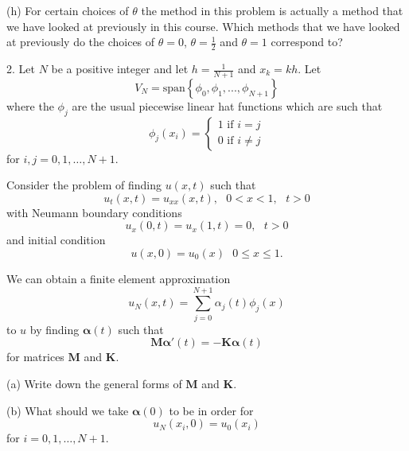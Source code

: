 \documentclass[11pt,twoside,reqno,a4paper]{amsart}
\begin{document}
(h) For certain choices of $\theta$ the method in this problem is actually a method that we have looked at previously in this course. Which methods that we have looked at previously do the choices of $\theta=0$, $\theta=\frac{1}{2}$ and $\theta=1$ correspond to?



\bigskip



2. Let $N$ be a positive integer and let $h=\frac{1}{N+1}$ and $x_k=kh$. Let
\[
V_N=\mbox{span}\left\{\phi_0,\phi_1,...,\phi_{N+1}\right\}
\]
where the $\phi_j$ are the usual piecewise linear hat functions which are such that
\[
\phi_j\left(x_i\right)=\left\{\begin{array}{c}1\mbox{ if }i=j \\ 0\mbox{ if } i\ne j\end{array}\right.
\]
for $i,j=0,1,\ldots,N+1$.

Consider the problem of finding $u\left(x,t\right)$ such that
\[
u_t\left(x,t\right)=u_{xx}\left(x,t\right),\mbox{ }0<x<1,\mbox{ }t>0
\]
with Neumann boundary conditions
\[
u_x\left(0,t\right)=u_x\left(1,t\right)=0,\mbox{ }t>0
\]
and initial condition
\[
u\left(x,0\right)=u_0\left(x\right)\mbox{ }0\le x\le1.
\]

We can obtain a finite element approximation
\[
u_N\left(x,t\right)=\sum_{j=0}^{N+1}\alpha_j\left(t\right)\phi_j\left(x\right)
\]
to $u$ by finding $\boldsymbol{\alpha}\left(t\right)$ such that
\[
\boldsymbol{M}\boldsymbol{\alpha}'\left(t\right)=-\boldsymbol{K}\boldsymbol{\alpha}\left(t\right)
\]
for matrices $\boldsymbol{M}$ and $\boldsymbol{K}$.

(a) Write down the general forms of $\boldsymbol{M}$ and $\boldsymbol{K}$.

(b) What should we take $\boldsymbol{\alpha}\left(0\right)$ to be in order for
\[
u_N\left(x_i,0\right)=u_0\left(x_i\right)
\]
for $i=0,1,\ldots,N+1$.
\end{document}
